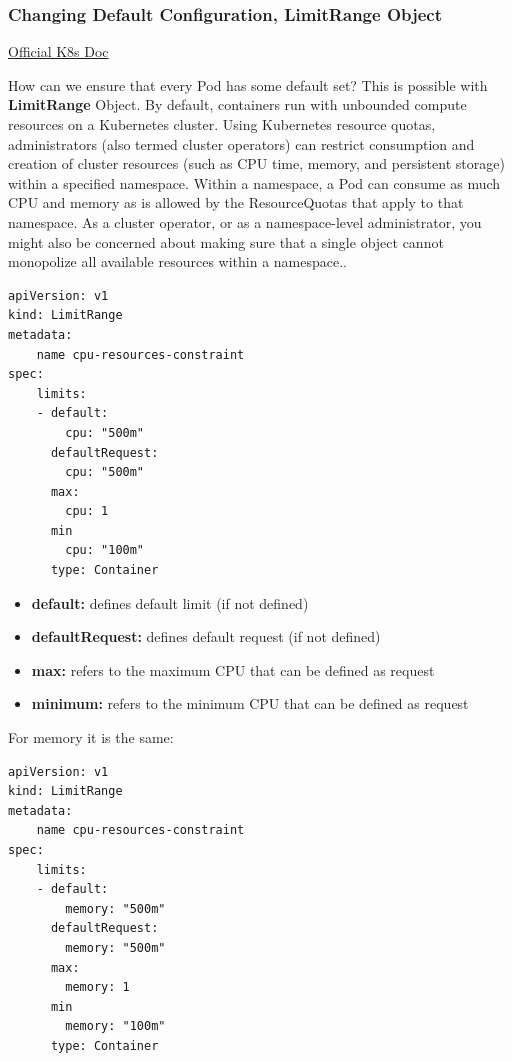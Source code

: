 \documentclass{article}
\newenvironment{codetemplate}[1][]{%
  \mybasecolorbox[#1]
  \itshape
}{%
  \endmybasecolorbox
}
\begin{document}
\subsubsection{Changing Default Configuration, LimitRange Object}

\href{https://kubernetes.io/docs/concepts/policy/limit-range/}{Official K8s Doc}

How can we ensure that every Pod has some default set? This is possible with \textbf{LimitRange} Object. By default, containers run with unbounded compute resources on a Kubernetes cluster. Using Kubernetes resource quotas, administrators (also termed cluster operators) can restrict consumption and creation of cluster resources (such as CPU time, memory, and persistent storage) within a specified namespace. Within a namespace, a Pod can consume as much CPU and memory as is allowed by the ResourceQuotas that apply to that namespace. As a cluster operator, or as a namespace-level administrator, you might also be concerned about making sure that a single object cannot monopolize all available resources within a namespace..

\begin{codetemplate}{}
\begin{verbatim}
apiVersion: v1
kind: LimitRange
metadata:
    name cpu-resources-constraint
spec:
    limits:
    - default:
        cpu: "500m"
      defaultRequest:
        cpu: "500m"
      max:
        cpu: 1
      min
        cpu: "100m"
      type: Container
\end{verbatim}
\end{codetemplate}

\begin{itemize}
    \item \textbf{default:} defines default limit (if not defined)
    \item \textbf{defaultRequest:} defines default request (if not defined)
    \item \textbf{max:} refers to the maximum CPU that can be defined as request
    \item \textbf{minimum:} refers to the minimum CPU that can be defined as request
\end{itemize}

For memory it is the same:
\begin{codetemplate}{}
\begin{verbatim}
apiVersion: v1
kind: LimitRange
metadata:
    name cpu-resources-constraint
spec:
    limits:
    - default:
        memory: "500m"
      defaultRequest:
        memory: "500m"
      max:
        memory: 1
      min
        memory: "100m"
      type: Container
\end{verbatim}
\end{codetemplate}
\end{document}
